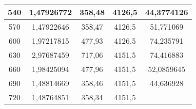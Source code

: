 \begin{longtable}[c]{ccccc}
    540   & 1,47926772 & 358,48 & 4126,5 & 44,3774126 \\
    \midrule
    570   & 1,47922646 & 358,47 & 4126,5 & 51,771069 \\
    \midrule
    600   & 1,97217815 & 477,93 & 4126,5 & 74,235791 \\
    \midrule
    630   & 2,97687459 & 717,06 & 4151,5 & 74,416883 \\
    \midrule
    660   & 1,98425094 & 477,96 & 4151,5 & 52,0859645 \\
    \midrule
    690   & 1,48814669 & 358,46 & 4151,5 & 44,636928 \\
    \midrule
    720   & 1,48764851 & 358,34 & 4151,5 &  \\
\end{longtable}
